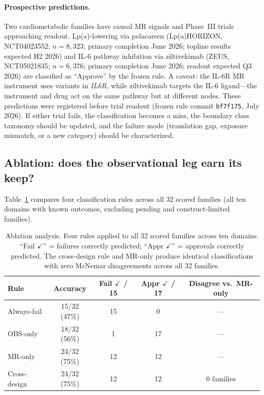 \documentclass[11pt]{article}
\begin{document}
\paragraph{Prospective predictions.}
Two cardiometabolic families have causal MR signals and Phase~III trials approaching readout. Lp(a)-lowering via pelacarsen (Lp(a)HORIZON, NCT04023552; $n = 8{,}323$; primary completion June 2026; topline results expected H2 2026) and IL-6 pathway inhibition via ziltivekimab (ZEUS, NCT05021835; $n = 6{,}376$; primary completion June 2026; readout expected Q3 2026) are classified as ``Approve'' by the frozen rule. A caveat: the IL-6R MR instrument uses variants in \emph{IL6R}, while ziltivekimab targets the IL-6 ligand---the instrument and drug act on the same pathway but at different nodes. These predictions were registered before trial readout (frozen rule commit \texttt{bf7f175}, July 2026). If either trial fails, the classification becomes a miss, the boundary class taxonomy should be updated, and the failure mode (translation gap, exposure mismatch, or a new category) should be characterized.

\subsection{Ablation: does the observational leg earn its keep?}
\label{sec:ablation}

Table~\ref{tab:ablation} compares four classification rules across all 32 scored families (all ten domains with known outcomes, excluding pending and construct-limited families).

\begin{table}[t]
\centering
\caption{Ablation analysis. Four rules applied to all 32 scored families across ten domains. ``Fail $\checkmark$'' = failures correctly predicted; ``Appr $\checkmark$'' = approvals correctly predicted. The cross-design rule and MR-only produce identical classifications with zero McNemar disagreements across all 32 families.}
\label{tab:ablation}
\begin{tabular}{lcccc}
\toprule
Rule & Accuracy & Fail $\checkmark$ / 15 & Appr $\checkmark$ / 17 & Disagree vs.\ MR-only \\
\midrule
Always-fail & 15/32 (47\%) & 15 & 0 & --- \\
OBS-only & 18/32 (56\%) & 1 & 17 & --- \\
MR-only & 24/32 (75\%) & 12 & 12 & --- \\
Cross-design & 24/32 (75\%) & 12 & 12 & 0 families \\
\bottomrule
\end{tabular}
\end{table}
\end{document}
